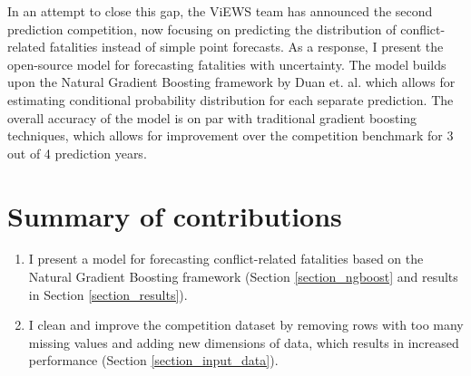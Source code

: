 \documentclass[runningheads]{llncs}
\begin{document}






    In an attempt to close this gap, the ViEWS team has announced the second prediction competition, now focusing on predicting the distribution of conflict-related fatalities instead of simple point forecasts. As a response, I present the open-source model for forecasting fatalities with uncertainty. The model builds upon the Natural Gradient Boosting framework by Duan et. al. \cite{duan2020ngboost} which allows for estimating conditional probability distribution for each separate prediction. The overall accuracy of the model is on par with traditional gradient boosting techniques, which allows for improvement over the competition benchmark for 3 out of 4 prediction years.


    \section{Summary of contributions}
    \begin{enumerate}
        \item I present a model for forecasting conflict-related fatalities based on the Natural Gradient Boosting framework (Section \ref{section_ngboost} and results in Section \ref{section_results}).
        \item I clean and improve the competition dataset by removing rows with too many missing values and adding new dimensions of data, which results in increased performance (Section \ref{section_input_data}).
    \end{enumerate}
\end{document}
